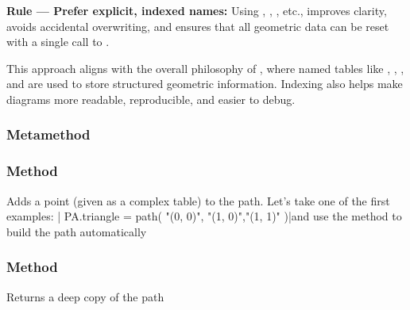 {\begin{mybox}
\textbf{Rule — Prefer explicit, indexed names:}
Using , , , etc., improves clarity, avoids accidental overwriting, and ensures that all geometric data can be reset with a single call to .
\end{mybox}

This approach aligns with the overall philosophy of , where named tables like , , , and  are used to store structured geometric information. Indexing also helps make diagrams more readable, reproducible, and easier to debug.

\subsubsection{Metamethod } %
\label{ssub:metamethod_tkzmeta_path_tostring}


\subsubsection{Method } %
\label{ssub:method_tkzmeth_path_add__point}

Adds a point (given as a complex table) to the path. Let's take one of the first examples: | PA.triangle = path({ "(0, 0)", "(1, 0)","(1, 1)" })|and use the method to build the path automatically

\begin{tkzexample}[latex=.3\textwidth]
\end{tkzexample}


\subsubsection{Method } %
\label{ssub:method_tkzmeth_path_copy}

Returns a deep copy of the path

\begin{tkzexample}[latex=.3\textwidth]
\end{tkzexample}

}
